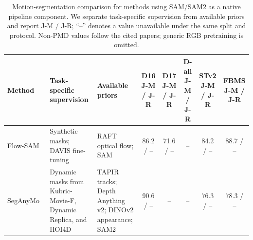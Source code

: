 \begin{table}[t]
\centering
\caption{
Motion-segmentation comparison for methods using SAM/SAM2 as a native pipeline
component. We separate task-specific supervision from available priors and
report J-M / J-R; ``--'' denotes a value unavailable under the same split and
protocol. Non-PMD values follow the cited papers; generic RGB pretraining is omitted.
}
\label{tab:sota_native_sam_jm_jr}
\scriptsize
\setlength{\tabcolsep}{2.0pt}
\renewcommand{\arraystretch}{1.12}
\begin{tabularx}{\textwidth}{@{}
>{\raggedright\arraybackslash}p{2.12cm}
>{\raggedright\arraybackslash}p{2.25cm}
>{\raggedright\arraybackslash}X
*{5}{c}
@{}}
\toprule
Method
& Task-specific supervision
& \makecell[l]{Available\\priors}
& \makecell{D16\\J-M / J-R}
& \makecell{D17\\J-M / J-R}
& \makecell{D-all\\J-M / J-R}
& \makecell{STv2\\J-M / J-R}
& \makecell{FBMS\\J-M / J-R} \\
\midrule

Flow-SAM~\citep{flow_sam}
& Synthetic masks; DAVIS fine-tuning
& RAFT optical flow; SAM
& 86.2 / --
& 71.6 / --
& --
& 84.2 / --
& 88.7 / -- \\

SegAnyMo~\citep{seg_any_mo}
& Dynamic masks from Kubric-Movie-F, Dynamic Replica, and HOI4D
& TAPIR tracks; Depth Anything v2; DINOv2 appearance; SAM2
& 90.6 / --
& --
& --
& 76.3 / --
& 78.3 / -- \\

\bottomrule
\end{tabularx}
\end{table}
